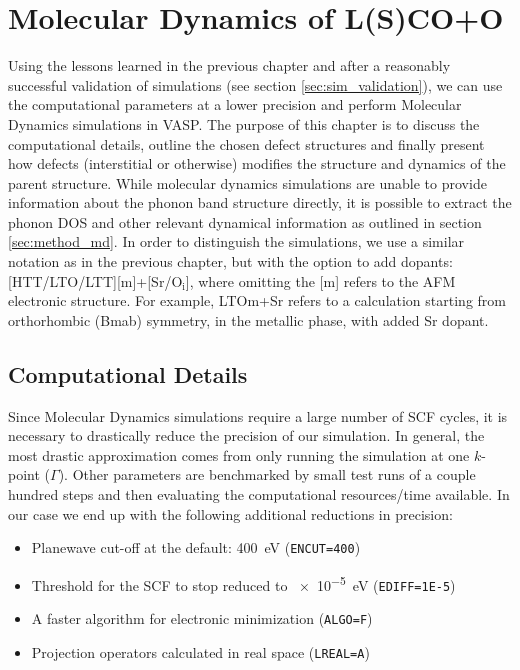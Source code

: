 \chapter{Molecular Dynamics of L(S)CO+O}\label{ch:md}
Using the lessons learned in the previous chapter and after a reasonably successful validation of simulations (see section \ref{sec:sim_validation}), we can use the computational parameters at a lower precision and perform Molecular Dynamics simulations in VASP. The purpose of this chapter is to discuss the computational details, outline the chosen defect structures and finally present how defects (interstitial or otherwise) modifies the structure and dynamics of the parent structure. While molecular dynamics simulations are unable to provide information about the phonon band structure directly, it is possible to extract the phonon DOS and other relevant dynamical information as outlined in section \ref{sec:method_md}. In order to distinguish the simulations, we use a similar notation as in the previous chapter, but with the option to add dopants: [HTT/LTO/LTT][m]+[Sr/O$_\text{i}$], where omitting the [m] refers to the AFM electronic structure. For example, LTOm+Sr refers to a calculation starting from orthorhombic (Bmab) symmetry, in the metallic phase, with added Sr dopant.

\section{Computational Details}
Since Molecular Dynamics simulations require a large number of SCF cycles, it is necessary to drastically reduce the precision of our simulation. In general, the most drastic approximation comes from only running the simulation at one $k$-point ($\Gamma$). Other parameters are benchmarked by small test runs of a couple hundred steps and then evaluating the computational resources/time available. In our case we end up with the following additional reductions in precision:

\begin{itemize}
	\item Planewave cut-off at the default: \SI{400}{\eV} (\texttt{ENCUT=400})
	\item Threshold for the SCF to stop reduced to \SI{e-5}{\eV} (\texttt{EDIFF=1E-5})
	\item A faster algorithm for electronic minimization (\texttt{ALGO=F})
	\item Projection operators calculated in real space (\texttt{LREAL=A})
\end{itemize}

